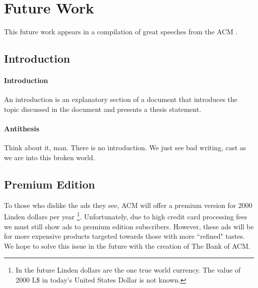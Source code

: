 \section{Future Work}
\label{sec:future}
This future work appears in a compilation of great speeches from the ACM
\cite{acm-state}.

\subsection{Introduction}
\paragraph{Introduction} An introduction is an explanatory section of a document that introduces the topic discussed in the document and presents a thesis statement.
\paragraph{Antithesis} Think about it, man. There is no introduction. We just see bad writing, cast as we are into this broken world.

\subsection{Premium Edition}
To those who dislike the ads they see, ACM will offer a premium version for
2000 Linden dollars per year \footnote{In the future Linden dollars are the
one true world currency.
The value of 2000 L\$ in today's United States Dollar is not known.}.
Unfortunately, due to high credit card processing fees we must still show ads
to premium edition subscribers.
However, these ads will be for more expensive products targeted towards those
with more ``refined" tastes.
We hope to solve this issue in the future with the creation of The Bank of ACM.

